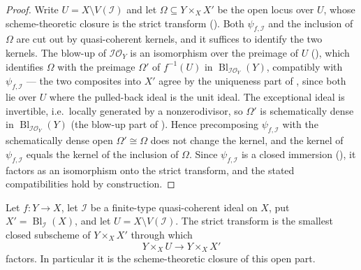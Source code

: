 \begin{proof}
  \leanok
  Write $U=X\setminus V(\mathcal I)$ and let
  $\Omega\subseteq Y\times_XX'$ be the open locus over $U$, whose
  scheme-theoretic closure is the strict transform
  ().  Both $\psi_{f,\mathcal I}$ and the
  inclusion of $\Omega$ are cut out by quasi-coherent kernels, and it
  suffices to identify the two kernels.  The blow-up of
  $\mathcal I\mathcal O_Y$ is an isomorphism over the preimage of $U$
  (), which identifies $\Omega$
  with the preimage $\Omega'$ of $f^{-1}(U)$ in
  $\operatorname{Bl}_{\mathcal I\mathcal O_Y}(Y)$, compatibly with
  $\psi_{f,\mathcal I}$ — the two composites into $X'$ agree by the
  uniqueness part of , since both
  lie over $U$ where the pulled-back ideal is the unit ideal.  The
  exceptional ideal is invertible, i.e.\ locally generated by a
  nonzerodivisor, so $\Omega'$ is schematically dense in
  $\operatorname{Bl}_{\mathcal I\mathcal O_Y}(Y)$ (the blow-up part of
  ).  Hence
  precomposing $\psi_{f,\mathcal I}$ with the schematically dense open
  $\Omega'\cong\Omega$ does not change the kernel, and the kernel of
  $\psi_{f,\mathcal I}$ equals the kernel of the inclusion of $\Omega$.
  Since $\psi_{f,\mathcal I}$ is a closed immersion
  (), it factors as an
  isomorphism onto the strict transform, and the stated compatibilities
  hold by construction.
\end{proof}


\begin{lemma}
  \label{lemma:nagata-strict-transform-closure-characterization}
  \leanok

  Let $f\colon Y\to X$, let $\mathcal I$ be a finite-type quasi-coherent
  ideal on $X$, put $X'=\operatorname{Bl}_{\mathcal I}(X)$, and let
  $U=X\setminus V(\mathcal I)$.  The strict transform is the smallest
  closed subscheme of $Y\times_XX'$ through which
  \[
    Y\times_XU\longrightarrow Y\times_XX'
  \]
  factors.  In particular it is the scheme-theoretic closure of this open
  part.
\end{lemma}

